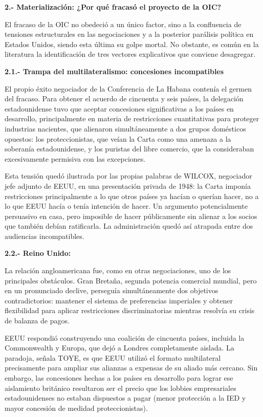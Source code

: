 \documentclass[10pt,a4paper]{article}
\begin{document}
\textbf{2.- Materialización: ¿Por qué fracasó el proyecto de la OIC?}

El fracaso de la OIC no obedeció a un único factor, sino a la confluencia de tensiones estructurales en las negociaciones y a la posterior  parálisis política en Estados Unidos, siendo esta última su golpe mortal. No obstante, es común en la literatura la identificación de tres vectores explicativos que conviene desagregar.

\textbf{2.1.- Trampa del multilateralismo: concesiones incompatibles}

El propio éxito negociador de la Conferencia de La Habana contenía el germen del fracaso. Para obtener el acuerdo de cincuenta y seis países, la delegación estadounidense tuvo que aceptar concesiones significativas a los países en desarrollo, principalmente en materia de restricciones cuantitativas para proteger industrias nacientes, que alienaron simultáneamente a dos grupos domésticos opuestos: los proteccionistas, que veían la Carta como una amenaza a la soberanía  estadounidense, y los puristas del libre comercio, que la consideraban excesivamente permisiva con las excepciones.

Esta tensión quedó ilustrada por las propias palabras de WILCOX, negociador jefe adjunto de EEUU, en una presentación privada de 1948: la Carta imponía restricciones principalmente a lo que otros países ya hacían o querían hacer, no a lo que EEUU hacía o tenía intención de hacer. Un argumento potencialmente persuasivo en casa, pero imposible de hacer públicamente sin alienar a los socios que también debían ratificarla. La administración quedó así atrapada entre dos audiencias incompatibles.

\textbf{2.2.- Reino Unido: }

La relación angloamericana fue, como en otras negociaciones, uno de los principales obstáculos. Gran Bretaña, segunda potencia comercial mundial, pero en un pronunciado declive, perseguía simultáneamente dos objetivos contradictorios: mantener el sistema de preferencias imperiales y obtener flexibilidad para aplicar restricciones discriminatorias mientras resolvía su crisis de balanza de pagos.

EEUU respondió construyendo una coalición de cincuenta países, incluida la Commonwealth y Europa, que dejó a Londres completamente aislada. La paradoja, señala TOYE, es que EEUU utilizó el formato multilateral precisamente para  ampliar sus alianzas a expensas de su aliado más cercano. Sin embargo, las concesiones hechas a los países en desarrollo para lograr ese aislamiento británico resultaron ser el precio que los lobbies empresariales estadounidenses no estaban dispuestos a pagar (menor protección a la IED y mayor concesión de medidad proteccionistas).
\end{document}
